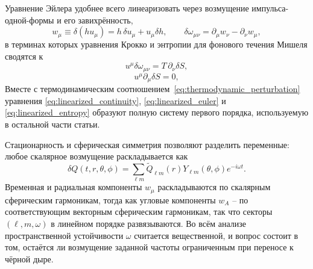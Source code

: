 \documentclass[12pt,a4paper,preprint,nopreprintline]{elsarticle}
\begin{document}
Уравнение Эйлера удобнее всего линеаризовать через возмущение импульса-одной-формы и его завихрённость,
\begin{equation}
    w_{\mu}
    \equiv
    \delta(hu_{\mu})
    =
    h\,\delta u_{\mu}+u_{\mu}\delta h,
    \qquad
    \delta\omega_{\mu\nu}
    =
    \partial_{\mu}w_{\nu}-\partial_{\nu}w_{\mu},
    \label{eq:perturbed_momentum}
\end{equation}
в терминах которых уравнения Крокко и энтропии для фонового течения Мишеля сводятся к
\begin{equation}
    u^{\mu}\delta\omega_{\mu\nu}
    =T\,\partial_{\nu}\delta S,
    \label{eq:linearized_euler}
\end{equation}
\begin{equation}
    u^{\mu}\partial_{\mu}\delta S=0,
    \label{eq:linearized_entropy}
\end{equation}
Вместе с термодинамическим соотношением~\eqref{eq:thermodynamic_perturbation} уравнения \eqref{eq:linearized_continuity}, \eqref{eq:linearized_euler} и \eqref{eq:linearized_entropy} образуют полную систему первого порядка, используемую в остальной части статьи.

Стационарность и сферическая симметрия позволяют разделить переменные: любое скалярное возмущение раскладывается как
\begin{equation}
    \delta Q(t,r,\theta,\phi)
    =
    \sum_{\ell m}
    \widetilde{Q}_{\ell m}(r)
    Y_{\ell m}(\theta,\phi)e^{-i\omega t}.
    \label{eq:harmonic_decomposition}
\end{equation}
Временная и радиальная компоненты $w_{\mu}$ раскладываются по скалярным сферическим гармоникам, тогда как угловые компоненты $w_{A}$ -- по соответствующим векторным сферическим гармоникам, так что секторы $(\ell,m,\omega)$ в линейном порядке развязываются. Во всём анализе пространственной устойчивости $\omega$ считается вещественной, и вопрос состоит в том, остаётся ли возмущение заданной частоты ограниченным при переносе к чёрной дыре.
\end{document}
